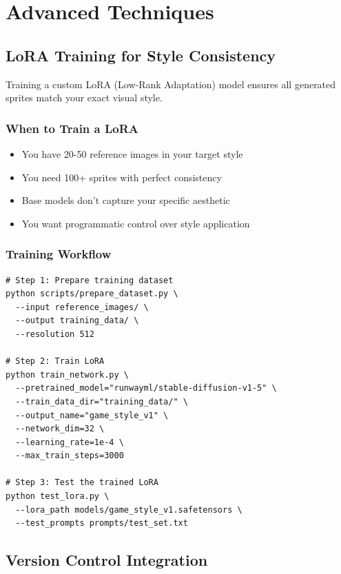 \documentclass[11pt]{article}
\begin{document}
\section{Advanced Techniques}

\subsection{LoRA Training for Style Consistency}

Training a custom LoRA (Low-Rank Adaptation) model ensures all generated sprites match your exact visual style.

\subsubsection{When to Train a LoRA}

\begin{itemize}
    \item You have 20-50 reference images in your target style
    \item You need 100+ sprites with perfect consistency
    \item Base models don't capture your specific aesthetic
    \item You want programmatic control over style application
\end{itemize}

\subsubsection{Training Workflow}

\begin{verbatim}
# Step 1: Prepare training dataset
python scripts/prepare_dataset.py \
  --input reference_images/ \
  --output training_data/ \
  --resolution 512

# Step 2: Train LoRA
python train_network.py \
  --pretrained_model="runwayml/stable-diffusion-v1-5" \
  --train_data_dir="training_data/" \
  --output_name="game_style_v1" \
  --network_dim=32 \
  --learning_rate=1e-4 \
  --max_train_steps=3000

# Step 3: Test the trained LoRA
python test_lora.py \
  --lora_path models/game_style_v1.safetensors \
  --test_prompts prompts/test_set.txt
\end{verbatim}

\subsection{Version Control Integration}
\end{document}
